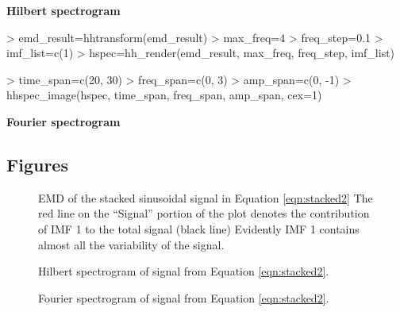 \documentclass[12pt]{article}
\begin{document}
\textbf{Hilbert spectrogram}
\begin{Schunk}
\begin{Sinput}
> emd_result=hhtransform(emd_result)
> max_freq=4
> freq_step=0.1
> imf_list=c(1)
> hspec=hh_render(emd_result, max_freq, freq_step, imf_list)
\end{Sinput}
\end{Schunk}

\begin{Schunk}
\begin{Sinput}
> time_span=c(20, 30)
> freq_span=c(0, 3)
> amp_span=c(0, -1)
> hhspec_image(hspec, time_span, freq_span, amp_span, cex=1)
\end{Sinput}
\end{Schunk}

\textbf{Fourier spectrogram}
\begin{Schunk}
\end{Schunk}

\subsection{Figures}

\FloatBarrier

\begin{figure}[h]
\begin{center}
\end{center}
\caption{EMD of the stacked sinusoidal signal in Equation \ref{eqn:stacked2}
The red line on the ``Signal'' portion of the plot denotes the contribution of IMF 1 to the total signal (black line)
Evidently IMF 1 contains almost all the variability of the signal.}
\label{fig:stacked2imf}
\end{figure}

\begin{figure}[h]
\begin{center}
\end{center}
\caption{Hilbert spectrogram of signal from Equation \ref{eqn:stacked2}.}
\label{fig:stacked2ht}
\end{figure}

\begin{figure}[h]
\begin{center}
\end{center}
\caption{Fourier spectrogram of signal from Equation \ref{eqn:stacked2}.}
\label{fig:stacked2ft}
\end{figure}
\end{document}
